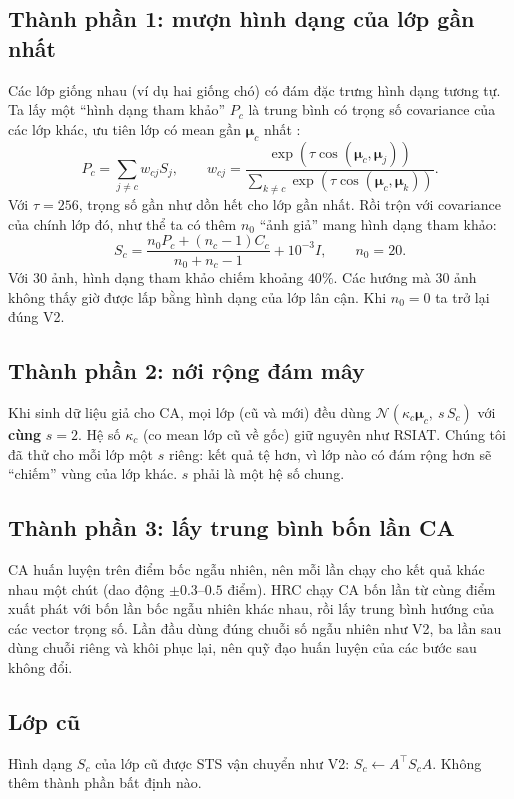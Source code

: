 \documentclass[11pt]{article}
\newcommand{\bmu}{\boldsymbol{\mu}}
\begin{document}
\subsection{Thành phần 1: mượn hình dạng của lớp gần nhất}
Các lớp giống nhau (ví dụ hai giống chó) có đám đặc trưng hình dạng tương tự. Ta lấy một ``hình dạng tham khảo'' $P_c$
là trung bình có trọng số covariance của các lớp khác, ưu tiên lớp có mean gần $\bmu_c$ nhất \cite{freelunch}:
\begin{equation}
P_c=\sum_{j\ne c}w_{cj}S_j,\qquad w_{cj}=\frac{\exp(\tau\cos(\bmu_c,\bmu_j))}{\sum_{k\ne c}\exp(\tau\cos(\bmu_c,\bmu_k))}.
\end{equation}
Với $\tau=256$, trọng số gần như dồn hết cho lớp gần nhất. Rồi trộn với covariance của chính lớp đó, như thể ta có
thêm $n_0$ ``ảnh giả'' mang hình dạng tham khảo:
\begin{equation}
S_c=\frac{n_0P_c+(n_c-1)C_c}{n_0+n_c-1}+10^{-3}I,\qquad n_0=20 .
\end{equation}
Với 30 ảnh, hình dạng tham khảo chiếm khoảng $40\%$. Các hướng mà 30 ảnh không thấy giờ được lấp bằng hình dạng của
lớp lân cận. Khi $n_0=0$ ta trở lại đúng V2.

\subsection{Thành phần 2: nới rộng đám mây}
Khi sinh dữ liệu giả cho CA, mọi lớp (cũ và mới) đều dùng $\mathcal{N}(\kappa_c\bmu_c,\ s\,S_c)$ với \textbf{cùng}
$s=2$. Hệ số $\kappa_c$ (co mean lớp cũ về gốc) giữ nguyên như RSIAT. Chúng tôi đã thử cho mỗi lớp một $s$ riêng: kết
quả tệ hơn, vì lớp nào có đám rộng hơn sẽ ``chiếm'' vùng của lớp khác. $s$ phải là một hệ số chung.

\subsection{Thành phần 3: lấy trung bình bốn lần CA}
CA huấn luyện trên điểm bốc ngẫu nhiên, nên mỗi lần chạy cho kết quả khác nhau một chút (dao động $\pm0.3$--$0.5$
điểm). HRC chạy CA bốn lần từ cùng điểm xuất phát với bốn lần bốc ngẫu nhiên khác nhau, rồi lấy trung bình hướng của
các vector trọng số. Lần đầu dùng đúng chuỗi số ngẫu nhiên như V2, ba lần sau dùng chuỗi riêng và khôi phục lại, nên
quỹ đạo huấn luyện của các bước sau không đổi.

\subsection{Lớp cũ}
Hình dạng $S_c$ của lớp cũ được STS vận chuyển như V2: $S_c\leftarrow A^\top S_cA$. Không thêm thành phần bất định nào.
\end{document}
